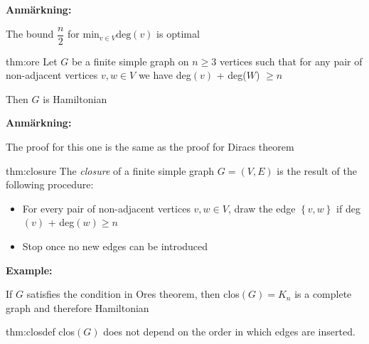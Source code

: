 \par\bigskip
\noindent\textbf{Anmärkning:}\par
\noindent The bound $\dfrac{n}{2}$ for $\text{min}_{v\in V}\text{deg}(v)$ is optimal
\par\bigskip
\begin{theo}[Ore]{thm:ore}
  Let $G$ be a finite simple graph on $n\geq3$ vertices such that for any pair of non-adjacent vertices $v,w\in V$ we have deg$(v)$ + deg($W$) $\geq n$
  \par\bigskip
  \noindent Then $G$ is Hamiltonian
\end{theo}
\par\bigskip
\noindent\textbf{Anmärkning:}\par
\noindent The proof for this one is the same as the proof for Diracs theorem
\par\bigskip
\begin{theo}[Closure]{thm:closure}
  The \textit{closure} of a finite simple graph $ G= (V,E)$ is the result of the following procedure:\par
  \begin{itemize}
  \item For every pair of non-adjacent vertices $v,w\in V$, draw the edge $\left\{v,w\right\}$ if deg$(v)$ + deg$(w)\geq n$\par
  \item Stop once no new edges can be introduced
  \end{itemize}
\end{theo}
\par\bigskip
\noindent\textbf{Example:}\par
\noindent If $G$ satisfies the condition in Ores theorem, then clos$(G) = K_n$ is a complete graph and therefore Hamiltonian
\par\bigskip
\begin{lem}{thm:closdef}
  clos$(G)$ does not depend on the order in which edges are inserted. 
\end{lem}
\par\bigskip
